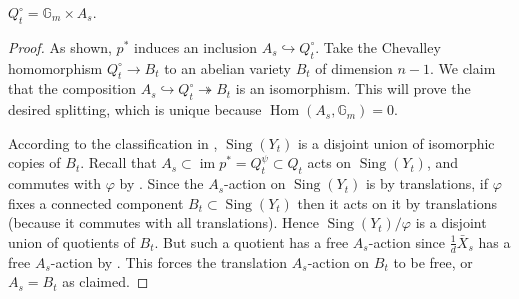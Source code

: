 \documentclass[reqno, letterpaper]{amsart}
\numberwithin{equation}{subsection}
\let\to\longrightarrow
\newcommand{\GG}{\mathbb{G}}
\DeclareMathOperator{\Hom}{Hom}
\DeclareMathOperator{\im}{im}
\DeclareMathOperator{\Sing}{Sing}
\begin{document}
			\begin{lemma} \label{lem:semistable reduction theorem:Qt splits 2}
				$Q_t^\circ = \GG_m \times A_s$.
			\end{lemma}
			\begin{proof}
				As shown, $p^*$ induces an inclusion $A_s \hookrightarrow Q_t^\circ$. Take the Chevalley homomorphism $Q_t^\circ \to B_t$ to an abelian variety $B_t$ of dimension $n-1$. We claim that the composition $A_s \hookrightarrow Q_t^\circ \twoheadrightarrow B_t$ is an isomorphism. This will prove the desired splitting, which is unique because $\Hom(A_s, \GG_m) = 0$.
				
				According to the classification in , $\Sing (Y_t)$ is a disjoint union of isomorphic copies of $B_t$. Recall that $A_s \subset \im p^* = Q_t^\psi \subset Q_t$ acts on $\Sing(Y_t)$, and commutes with $\varphi$ by . Since the $A_s$-action on $\Sing(Y_t)$ is by translations, if $\varphi$ fixes a connected component $B_t \subset \Sing(Y_t)$ then it acts on it by translations (because it commutes with all translations). Hence $\Sing(Y_t)/\varphi$ is a disjoint union of quotients of $B_t$. But such a quotient has a free $A_s$-action since $\frac{1}{d} \bar X_s$ has a free $A_s$-action by . This forces the translation $A_s$-action on $B_t$ to be free, or $A_s = B_t$ as claimed.
			\end{proof}
			
\end{document}
